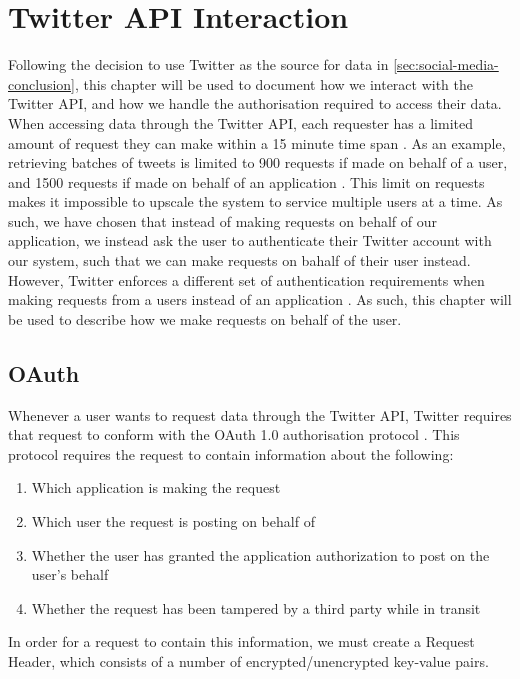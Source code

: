 \chapter{Twitter API Interaction}\label{cha:twitterAPI}
Following the decision to use Twitter as the source for data in
\autoref{sec:social-media-conclusion}, this chapter will be used to document how
we interact with the Twitter API, and how we handle the authorisation required
to access their data. When accessing data through the Twitter API, each
requester has a limited amount of request they can make within a 15 minute time
span \citep{twitterRateLimit}. As an example, retrieving batches of tweets is
limited to 900 requests if made on behalf of a user, and 1500 requests if made
on behalf of an application \citep{twitterTimelineRateLimit}. This limit on
requests makes it impossible to upscale the system to service multiple users at
a time. As such, we have chosen that instead of making requests on behalf of our
application, we instead ask the user to authenticate their Twitter account with
our system, such that we can make requests on bahalf of their user instead.
However, Twitter enforces a different set of authentication requirements when
making requests from a users instead of an application \citep{TwitterAPIAuth}.
As such, this chapter will be used to describe how we make requests on behalf of
the user. 

\section{OAuth}
Whenever a user wants to request data through the Twitter API, Twitter requires
that request to conform with the OAuth 1.0 authorisation protocol
\citep{OAuth1}. This protocol requires the request to contain information about
the following\citep{TwitterAPIAuth}:

\begin{enumerate}
 	\item Which application is making the request
	\item Which user the request is posting on behalf of
	\item Whether the user has granted the application authorization to post on the
user’s behalf 
	\item Whether the request has been tampered by a third party while in transit
\end{enumerate}

In order for a request to contain this information, we must create a Request
Header, which consists of a number of encrypted/unencrypted key-value pairs. 

